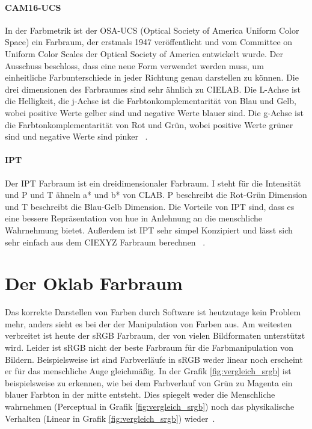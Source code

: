 \documentclass[12pt, a4paper, ngerman]{article}
\begin{document}
\paragraph{CAM16-UCS}
In der Farbmetrik ist der OSA-UCS (Optical Society of America Uniform Color Space) ein Farbraum, 
der erstmals 1947 veröffentlicht und vom Committee on Uniform Color Scales der Optical Society of America entwickelt wurde.
Der Ausschuss beschloss, dass eine neue Form verwendet werden muss, 
um einheitliche Farbunterschiede in jeder Richtung genau darstellen zu können.
Die drei dimensionen des Farbraumes sind sehr ähnlich zu CIELAB.
Die L-Achse ist die Helligkeit, die j-Achse ist die Farbtonkomplementarität von Blau und Gelb, 
wobei positive Werte gelber sind und negative Werte blauer sind.
Die g-Achse ist die Farbtonkomplementarität von Rot und Grün, 
wobei positive Werte grüner sind und negative Werte sind pinker ~\cite{OSA-UCS_2023}.

\paragraph{IPT}
Der IPT Farbraum ist ein dreidimensionaler Farbraum.
I steht für die Intensität und P und T ähneln a* und b* von CLAB. 
P beschreibt die Rot-Grün Dimension und T beschreibt die Blau-Gelb Dimension.
Die Vorteile von IPT sind, dass es eine bessere Repräsentation von hue 
in Anlehnung an die menschliche Wahrnehmung bietet. 
Außerdem ist IPT sehr simpel Konzipiert und lässt sich sehr einfach aus dem CIEXYZ Farbraum berechnen ~\cite{Ebner_1998}.

\section{Der Oklab Farbraum}
Das korrekte Darstellen von Farben durch Software ist heutzutage kein Problem mehr, 
anders sieht es bei der der Manipulation von Farben aus.
Am weitesten verbreitet ist heute der sRGB Farbraum, der von vielen Bildformaten unterstützt wird.
Leider ist sRGB nicht der beste Farbraum für die Farbmanipulation von Bildern.
Beispielsweise ist sind Farbverläufe in sRGB weder linear noch erscheint er für das menschliche Auge gleichmäßig.
In der Grafik \ref{fig:vergleich_srgb} ist beispielsweise zu erkennen, wie bei dem Farbverlauf von Grün zu Magenta ein blauer Farbton in der mitte entsteht.
Dies spiegelt weder die Menschliche wahrnehmen (Perceptual in Grafik \ref{fig:vergleich_srgb}) 
noch das physikalische Verhalten (Linear in Grafik \ref{fig:vergleich_srgb}) wieder~\cite{Ottosson_2020}.
\end{document}
